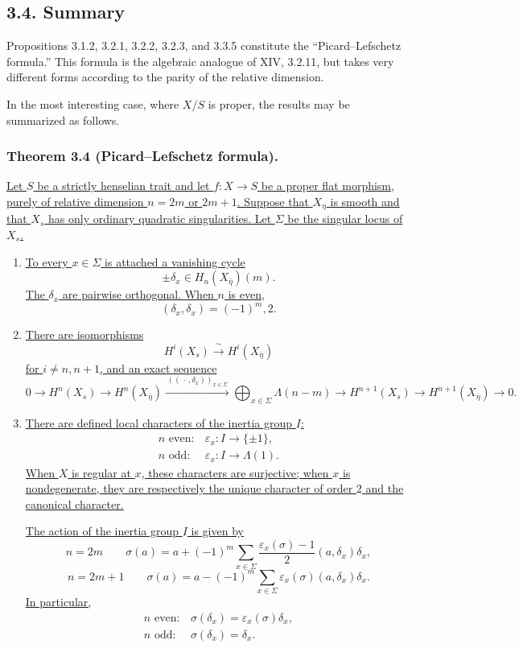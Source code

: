 \subsection*{3.4. Summary}

Propositions 3.1.2, 3.2.1, 3.2.2, 3.2.3, and 3.3.5 constitute
the ``Picard--Lefschetz formula.''  This formula is the algebraic
analogue of XIV, 3.2.11, but takes very different forms according to
the parity of the relative dimension.

In the most interesting case, where $X/S$ is proper, the results may
be summarized as follows.

\subsubsection*{Theorem 3.4 (Picard--Lefschetz formula).}
\underline{Let $S$ be a strictly henselian trait and let
$f:X\to S$ be a proper flat morphism, purely of relative dimension
$n=2m$ or $2m+1$.  Suppose that $X_\eta$ is smooth and that $X_s$
has only ordinary quadratic singularities.  Let $\Sigma$ be the
singular locus of $X_s$.}

\begin{enumerate}
\item[(i)] \underline{To every $x\in\Sigma$ is attached a vanishing
cycle}
\[
\pm\delta_x\in H_n(X_{\bar\eta})(m).
\]
\underline{The $\delta_x$ are pairwise orthogonal.  When $n$ is even,}
\[
(\delta_x,\delta_x)=(-1)^m,2.
\]

\item[(ii)] \underline{There are isomorphisms}
\[
H^i(X_s)\xrightarrow{\ \sim\ }H^i(X_{\bar\eta})
\]
\underline{for $i\ne n,n+1$, and an exact sequence}
\[
0\longrightarrow H^n(X_s)
 \longrightarrow H^n(X_{\bar\eta})
 \xrightarrow{\,((\,\cdot\,,\delta_x))_{x\in\Sigma}\,}
 \bigoplus_{x\in\Sigma}\Lambda(n-m)
 \longrightarrow H^{n+1}(X_s)
 \longrightarrow H^{n+1}(X_{\bar\eta})
 \longrightarrow0.
\]

\item[(iii)] \underline{There are defined local characters of the
inertia group $I$:}
\[
\begin{array}{lll}
n\text{ even}:&\varepsilon_x:I\longrightarrow\{\pm1\},\\[2pt]
n\text{ odd}:&\varepsilon_x:I\longrightarrow\Lambda(1).
\end{array}
\]
\underline{When $X$ is regular at $x$, these characters are
surjective; when $x$ is nondegenerate, they are respectively the
unique character of order $2$ and the canonical character.}

\underline{The action of the inertia group $I$ is given by}
\[
n=2m\qquad
\sigma(a)=a+(-1)^m\sum_{x\in\Sigma}
 \frac{\varepsilon_x(\sigma)-1}{2}
 (a,\delta_x)\delta_x,
\]
\[
n=2m+1\qquad
\sigma(a)=a-(-1)^m\sum_{x\in\Sigma}
 \varepsilon_x(\sigma)(a,\delta_x)\delta_x.
\]
\underline{In particular,}
\[
\begin{array}{lll}
n\text{ even}:&\sigma(\delta_x)=\varepsilon_x(\sigma)\delta_x,\\[2pt]
n\text{ odd}:&\sigma(\delta_x)=\delta_x.
\end{array}
\]
\end{enumerate}
